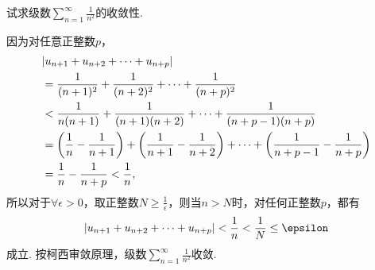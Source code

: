 \begin{example}
试求级数\(\sum\limits_{n=1}^\infty \frac{1}{n^2}\)的收敛性.
\begin{solution}
因为对任意正整数\(p\)，\begin{align*}
&\abs{u_{n+1}+u_{n+2}+\dotsb+u_{n+p}} \\
&=\frac{1}{(n+1)^2}+\frac{1}{(n+2)^2}+\dotsb+\frac{1}{(n+p)^2} \\
&<\frac{1}{n(n+1)}+\frac{1}{(n+1)(n+2)}+\dotsb+\frac{1}{(n+p-1)(n+p)} \\
&=\left(\frac{1}{n}-\frac{1}{n+1}\right)+\left(\frac{1}{n+1}-\frac{1}{n+2}\right)+\dotsb+\left(\frac{1}{n+p-1}-\frac{1}{n+p}\right) \\
&=\frac{1}{n}-\frac{1}{n+p} < \frac{1}{n},
\end{align*}
所以对于\(\forall \epsilon > 0\)，取正整数\(N \geq \frac{1}{\epsilon}\)，则当\(n > N\)时，对任何正整数\(p\)，都有\[
\abs{u_{n+1}+u_{n+2}+\dotsb+u_{n+p}}
< \frac{1}{n}
< \frac{1}{N}
\leq \epsilon
\]成立.
按柯西审敛原理，级数\(\sum\limits_{n=1}^\infty \frac{1}{n^2}\)收敛.
\end{solution}
\end{example}
